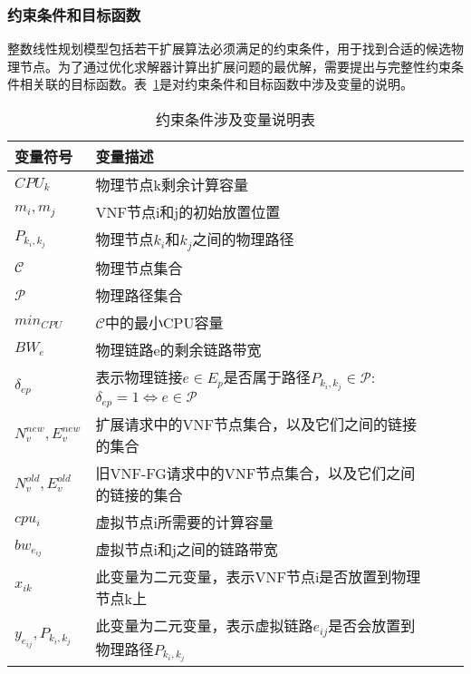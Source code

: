 \subsubsection{约束条件和目标函数}
整数线性规划模型包括若干扩展算法必须满足的约束条件，用于找到合适的候选物理节点。为了通过优化求解器计算出扩展问题的最优解，需要提出与完整性约束条件相关联的目标函数。表~\ref{table:2}是对约束条件和目标函数中涉及变量的说明。
\begin{table}[H]
    \setlength{\baselineskip}{1.2em}
    \setlength{\parskip}{0ex}
    \setlength{\parindent}{0pt}
    \centering
    
    \caption{约束条件涉及变量说明表}
    \label{table:2}
    \begin{tabular}{llp{40pt}p{230pt}}
        \toprule
        \textbf{变量符号} & \textbf{变量描述}\\
        \midrule
        $CPU_k$&物理节点k剩余计算容量\\
        \midrule
        $m_i,m_j$&VNF节点i和j的初始放置位置\\
        \midrule
        $P_{k_i,k_j}$&物理节点$k_i$和$k_j$之间的物理路径\\
        \midrule
        $\mathcal{C}$&物理节点集合\\
        \midrule
        $\mathcal{P}$	&物理路径集合\\
        \midrule
        $min_{CPU}$&$\mathcal{C}$中的最小CPU容量\\
        \midrule
        $BW_e$&物理链路e的剩余链路带宽\\
        \midrule
        $\delta_{ep}$&表示物理链接$e\in E_p$是否属于路径$P_{k_i,k_j}\in \mathcal{P}$: $\delta_{e p}=1\Leftrightarrow e\in \mathcal{P}$\\
        \midrule
        $N_v^{new},E_v^{new}$&扩展请求中的VNF节点集合，以及它们之间的链接的集合\\
        \midrule
        $N_v^{old},E_v^{old}$&旧VNF-FG请求中的VNF节点集合，以及它们之间的链接的集合\\
        \midrule
        $cpu_i$&虚拟节点i所需要的计算容量\\
        \midrule
        $bw_{e_{ij}}$&虚拟节点i和j之间的链路带宽\\
        \midrule
        $x_{ik}$&此变量为二元变量，表示VNF节点i是否放置到物理节点k上\\
        \midrule
        $y_{e_{ij}},P_{k_i,k_j}$&此变量为二元变量，表示虚拟链路$e_{ij}$是否会放置到物理路径${P_{k_i,k_j}}$\\
        \bottomrule
    \end{tabular}
\end{table}



